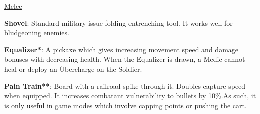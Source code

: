 \newpage

\begin {center}
\underline {Melee}
\end {center}

{\bf Shovel}: Standard military issue folding entrenching tool. It works well for bludgeoning enemies. 

{\bf Equalizer*}: A pickaxe which gives increasing movement speed and damage bonuses with decreasing health. When the Equalizer is drawn, a Medic cannot heal or deploy an Übercharge on the Soldier.

{\bf Pain Train**}: Board with a railroad spike through it. Doubles capture speed when equipped. It increases combatant vulnerability to bullets by 10\%.As such, it is only useful in game modes which involve capping points or pushing the cart.

